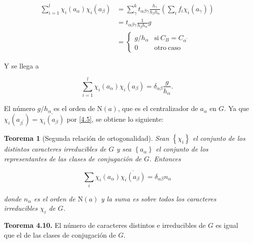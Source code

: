 \documentclass[12pt]{book}
\newtheorem{theorem}{Teorema}[section]
\theoremstyle{definition}
\newcounter{in}
\begin{document}
\begin{equation*}
  \begin{aligned}
    \sum_{i=1}^{l} \chi_{i}(a_{\alpha}) \chi_{i}(a_{\beta}) &= \sum_{\gamma}^{k} t_{\alpha \beta \gamma} \frac{h_{\gamma}}{h_{\beta} h_{\alpha}} (\sum_{i} f_{i} \chi_{i}(a_{\gamma})) \\
    &= t_{\alpha \beta \gamma} \frac{1}{h_{\beta} h_{\alpha}}g \\
    &=  \left\{
	       \begin{array}{ll}
		 g/h_{\alpha}      & \mathrm{si\ } C_{B} = C_{\alpha^{'}} \\
		 0      & \mathrm{otro\ caso\ } 
	       \end{array}
	     \right.
    \end{aligned}
\end{equation*}

Y se llega a

\begin{equation*}
   \sum_{i=1}^{l} \chi_{i}(a_{\alpha}) \chi_{i}(a_{\beta})=\delta_{\alpha \beta} \frac{g}{h_{\alpha}}.
\end{equation*}

El número $g/h_{\alpha}$ es el orden de $\mathrm{N}(a)$, que es el
centralizador de $a_{\alpha}$ en $G$. Ya que
$\chi_{i}(a_{\beta^{'}})=\overline{\chi_{i} (a_{\beta})}$ por
\ref{4.5}, se obtiene lo siguiente:

\begin{theorem}[Segunda relación de ortogonalidad]
  \label{segunda}
   Sean $\left\{\chi_{i} \right\}$ el conjunto de los
distintos caracteres irreducibles de $G$ y sea
$\left\{a_{\alpha} \right\}$ el conjunto de los representantes de las
clases de conjugación de $G$. Entonces

\begin{equation*}
  \sum_{i} \chi_{i}(a_{\alpha}) \overline{\chi_{i} (a_{\beta})} = \delta_{\alpha \beta} n_{\alpha}
\end{equation*}

donde $n_{\alpha}$ es el orden de $\mathrm{N}(a)$ y la suma es sobre
todos los caracteres irreducibles $\chi_{i}$ de $G$.
\end{theorem}


\textbf{Teorema  4.10. } El número de caracteres distintos e irreducibles de $G$ es
igual que el de las clases de conjugación de $G$.
\end{document}
